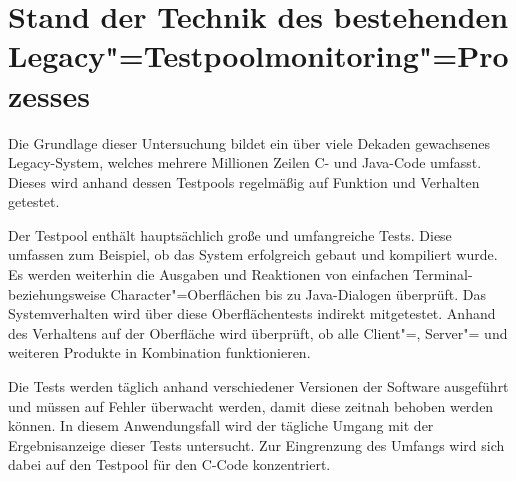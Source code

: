 \chapter{Stand der Technik des bestehenden Legacy"=Testpoolmonitoring"=Prozesses}
\label{ch:IST-Zustand}




Die Grundlage dieser Untersuchung bildet ein über viele Dekaden gewachsenes Legacy-System, welches mehrere Millionen Zeilen C- und Java-Code umfasst. Dieses wird anhand dessen Testpools regelmäßig auf Funktion und Verhalten getestet.


Der Testpool enthält hauptsächlich große und umfangreiche Tests. Diese umfassen zum Beispiel, ob das System erfolgreich gebaut und kompiliert wurde. Es werden weiterhin die Ausgaben und Reaktionen von einfachen Terminal- beziehungsweise Character"=Oberflächen bis zu
Java-Dialogen überprüft. Das Systemverhalten wird über diese Oberflächentests indirekt mitgetestet. Anhand des Verhaltens auf der Oberfläche wird überprüft, ob alle Client"=, Server"= und weiteren Produkte in Kombination funktionieren.

Die Tests werden täglich anhand verschiedener Versionen der Software ausgeführt und müssen auf Fehler überwacht werden, damit diese zeitnah behoben werden können.
In diesem Anwendungsfall wird der tägliche Umgang mit der Ergebnisanzeige dieser Tests untersucht. Zur Eingrenzung des Umfangs wird sich dabei auf den Testpool für den C-Code konzentriert.

